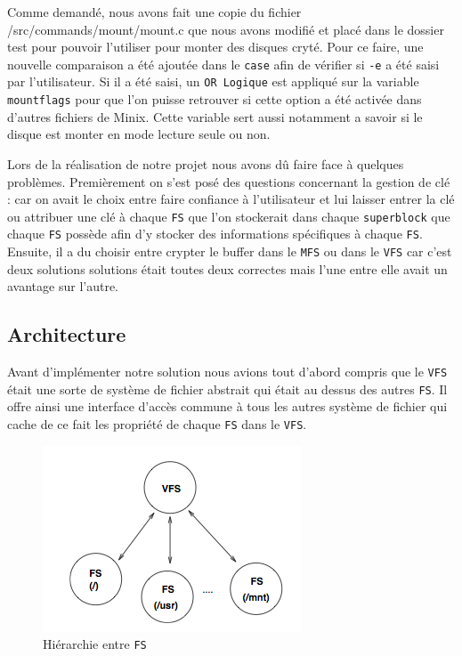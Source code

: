 \documentclass[10pt, onecolumn] {IEEEtran}
\begin{document}
Comme demandé, nous avons fait une copie du fichier /src/commands/mount/mount.c que nous avons modifié et placé dans le dossier test pour pouvoir l'utiliser pour monter des disques cryté. Pour ce faire, une nouvelle comparaison a été ajoutée dans le \texttt{case} afin de vérifier si \texttt{-e} a été saisi par l'utilisateur. Si il a été saisi, un \texttt{OR Logique} est appliqué sur la variable \texttt{mountflags} pour que l'on puisse retrouver si cette option a été activée dans d'autres fichiers de Minix. Cette variable sert aussi notamment a savoir si le disque est monter en mode lecture seule ou non.

Lors de la réalisation de notre projet nous avons dû faire face à quelques problèmes. Premièrement on s'est posé des questions concernant la gestion de clé : car on avait le choix entre faire confiance à l'utilisateur et lui laisser entrer la clé ou attribuer une clé à chaque \texttt{FS} que l'on stockerait dans chaque \texttt{superblock} que chaque \texttt{FS} possède afin d'y stocker des informations spécifiques à chaque \texttt{FS}.  Ensuite, il a du choisir entre crypter le buffer dans le \texttt{MFS} ou dans le \texttt{VFS} car c'est deux solutions solutions était toutes deux correctes mais l'une entre elle avait un avantage sur l'autre.\\   

\subsection{Architecture}

Avant d'implémenter notre solution nous avions tout d'abord compris que le \texttt{VFS} était une sorte de système de fichier abstrait qui était au dessus des autres \texttt{FS}. Il offre ainsi une interface d'accès commune à tous les autres système de fichier qui cache de ce fait les propriété de chaque \texttt{FS} dans le \texttt{VFS}. 

\begin{figure}[h]
\begin{center}
\includegraphics [scale=0.5] {figures/VFS-FS.png} 
\caption{Hiérarchie entre \texttt{FS}}
\label{default}
\end{center}
\end{figure}
     
\end{document}
